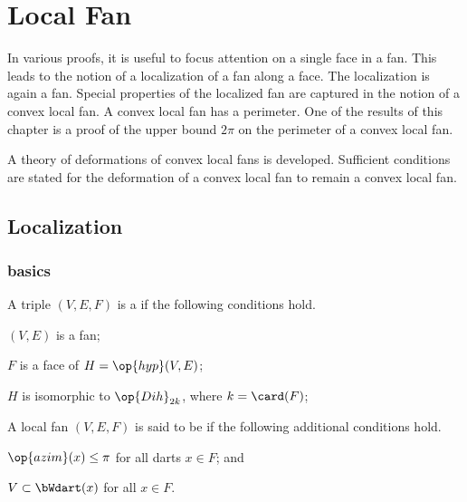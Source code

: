 %
\chapter{Local Fan}\label{sec:local}


\begin{summary}
In various proofs, it is useful to focus attention on a single face
in a fan.  This leads to the notion of a localization of a fan along
a face.  The localization is again a fan.  Special properties of the
localized fan are captured in the notion of a convex local fan.  A convex local fan has a perimeter.  One of the results of this chapter is a proof
of the upper bound $2\pi$ on the perimeter of a convex local fan.

A theory of deformations of convex local fans is developed.  Sufficient
conditions are stated for the deformation of a convex local fan to remain
a convex local fan.
\end{summary}


\section{Localization}


\subsection{basics}


\begin{definition} 
A triple $(V,E,F)$ is a  if the following conditions hold.
\begin{description} 
\item {} $(V,E)$ is a fan;
\item {} $F$ is a face of $H = \op{hyp}(V,E)$;
\item {} $H$ is isomorphic to $\op{Dih}_{2k}$, where $k =
\card(F)$;
\end{description}
A local fan $(V,E,F)$ is said to be  if the following additional conditions hold.
\begin{description}
\item {} $\op{azim}(x)\le \pi$ for all darts $x\in F$; and
\item {} $V\subset \bWdart(x)$ for all $x\in F$.
\end{description}
\end{definition}
%

